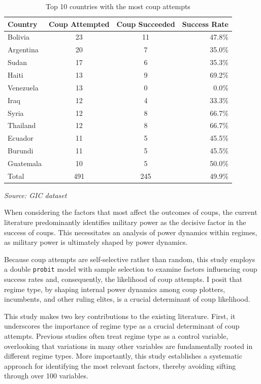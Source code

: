 \documentclass[
  12pt,
]{report}
\begin{document}
\begin{longtable}{@{\extracolsep{\fill}}lccr}

\caption{\label{tbl-coups}Top 10 countries with the most coup attempts}

\tabularnewline

\toprule
Country & Coup Attempted & Coup Succeeded & Success Rate \\ 
\midrule\addlinespace[2.5pt]
Bolivia & 23 & 11 & 47.8\% \\ 
Argentina & 20 & 7 & 35.0\% \\ 
Sudan & 17 & 6 & 35.3\% \\ 
Haiti & 13 & 9 & 69.2\% \\ 
Venezuela & 13 & 0 & 0.0\% \\ 
Iraq & 12 & 4 & 33.3\% \\ 
Syria & 12 & 8 & 66.7\% \\ 
Thailand & 12 & 8 & 66.7\% \\ 
Ecuador & 11 & 5 & 45.5\% \\ 
Burundi & 11 & 5 & 45.5\% \\ 
Guatemala & 10 & 5 & 50.0\% \\ 
Total & 491 & 245 & 49.9\% \\ 
\bottomrule

\end{longtable}

\begin{minipage}{\linewidth}
\emph{Source: GIC dataset}\\
\end{minipage}
\endgroup

When considering the factors that most affect the outcomes of coups, the
current literature predominantly identifies military power as the
decisive factor in the success of coups. This necessitates an analysis
of power dynamics within regimes, as military power is ultimately shaped
by power dynamics.

Because coup attempts are self-selective rather than random, this study
employs a double \texttt{probit} model with sample selection to examine
factors influencing coup success rates and, consequently, the likelihood
of coup attempts. I posit that regime type, by shaping internal power
dynamics among coup plotters, incumbents, and other ruling elites, is a
crucial determinant of coup likelihood.

This study makes two key contributions to the existing literature.
First, it underscores the importance of regime type as a crucial
determinant of coup attempts. Previous studies often treat regime type
as a control variable, overlooking that variations in many other
variables are fundamentally rooted in different regime types. More
importantly, this study establishes a systematic approach for
identifying the most relevant factors, thereby avoiding sifting through
over 100 variables.
\end{document}
